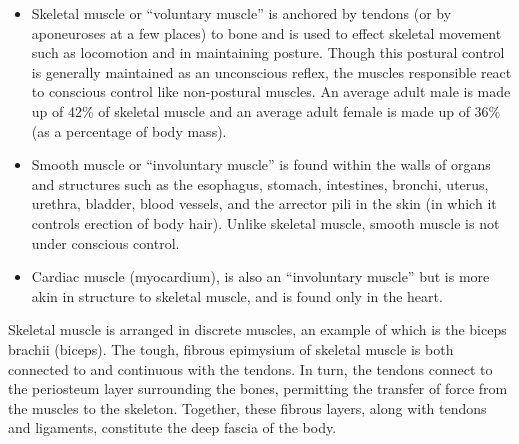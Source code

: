 \begin{itemize}
\tightlist
\item
  Skeletal muscle or ``voluntary muscle'' is anchored by tendons (or by aponeuroses at a few places) to bone and is used to effect skeletal movement such as locomotion and in maintaining posture. Though this postural control is generally maintained as an unconscious reflex, the muscles responsible react to conscious control like non-postural muscles. An average adult male is made up of 42\% of skeletal muscle and an average adult female is made up of 36\% (as a percentage of body mass).
\item
  Smooth muscle or ``involuntary muscle'' is found within the walls of organs and structures such as the esophagus, stomach, intestines, bronchi, uterus, urethra, bladder, blood vessels, and the arrector pili in the skin (in which it controls erection of body hair). Unlike skeletal muscle, smooth muscle is not under conscious control.
\item
  Cardiac muscle (myocardium), is also an ``involuntary muscle'' but is more akin in structure to skeletal muscle, and is found only in the heart.
\end{itemize}



Skeletal muscle is arranged in discrete muscles, an example of which is the biceps brachii (biceps). The tough, fibrous epimysium of skeletal muscle is both connected to and continuous with the tendons. In turn, the tendons connect to the periosteum layer surrounding the bones, permitting the transfer of force from the muscles to the skeleton. Together, these fibrous layers, along with tendons and ligaments, constitute the deep fascia of the body.

